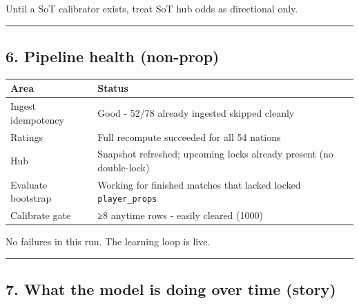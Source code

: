 \documentclass[
]{article}
\newcounter{none} %
\begin{document}
Until a SoT calibrator exists, treat SoT hub odds as directional only.

\begin{center}\rule{0.5\linewidth}{0.5pt}\end{center}

\subsection{6. Pipeline health
(non-prop)}\label{pipeline-health-non-prop}

{\def\LTcaptype{none} %
\begin{longtable}[]{@{}
  >{\raggedright\arraybackslash}p{}
  >{\raggedright\arraybackslash}p{}@{}}
\toprule\noalign{}
\begin{minipage}[b]{\linewidth}\raggedright
Area
\end{minipage} & \begin{minipage}[b]{\linewidth}\raggedright
Status
\end{minipage} \\
\midrule\noalign{}
\endhead
\bottomrule\noalign{}
\endlastfoot
Ingest idempotency & Good - 52/78 already ingested skipped cleanly \\
Ratings & Full recompute succeeded for all 54 nations \\
Hub & Snapshot refreshed; upcoming locks already present (no
double-lock) \\
Evaluate bootstrap & Working for finished matches that lacked locked
\texttt{player\_props} \\
Calibrate gate & ≥8 anytime rows - easily cleared (1000) \\
\end{longtable}
}

No failures in this run. The learning loop is live.

\begin{center}\rule{0.5\linewidth}{0.5pt}\end{center}

\subsection{7. What the model is doing over time
(story)}\label{what-the-model-is-doing-over-time-story}
\end{document}
